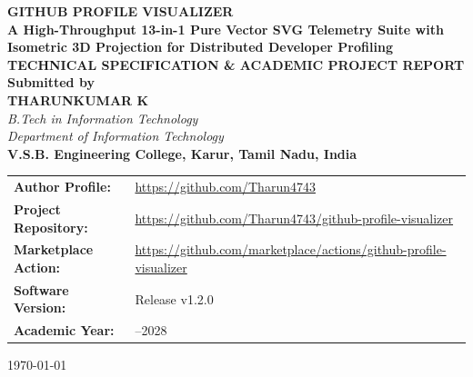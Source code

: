 \documentclass[12pt,a4paper]{report}
\begin{document}
\hypersetup{pageanchor=false}
\begin{titlepage}
    \centering
    \vspace*{1.0cm}
    
    {\Huge \textbf{GITHUB PROFILE VISUALIZER}}\\[0.4cm]
    {\LARGE \textbf{A High-Throughput 13-in-1 Pure Vector SVG Telemetry Suite with Isometric 3D Projection for Distributed Developer Profiling}}\\[1.5cm]
    
    {\large \textbf{TECHNICAL SPECIFICATION \& ACADEMIC PROJECT REPORT}}\\[1.2cm]
    
    \textbf{Submitted by}\\[0.3cm]
    {\Large \textbf{THARUNKUMAR K}}\\[0.2cm]
    \textit{B.Tech in Information Technology}\\[0.1cm]
    \textit{Department of Information Technology}\\[0.2cm]
    \textbf{V.S.B. Engineering College, Karur, Tamil Nadu, India}\\[1.5cm]
    
    \vfill
    
    \begin{tabular}{>{\raggedright\arraybackslash\bfseries}p{4.2cm}>{\raggedright\arraybackslash}p{10.2cm}}
        Author Profile: & \url{https://github.com/Tharun4743} \\
        Project Repository: & \url{https://github.com/Tharun4743/github-profile-visualizer} \\
        Marketplace Action: & \url{https://github.com/marketplace/actions/github-profile-visualizer} \\
        Software Version: & Release v1.2.0 \\
        Academic Year: & 2024--2028 \\
    \end{tabular}
    
    \vspace*{0.8cm}
    {\small \today}
\end{titlepage}
\hypersetup{pageanchor=true}

\cleardoublepage
{}
\setcounter{page}{1}
\end{document}
